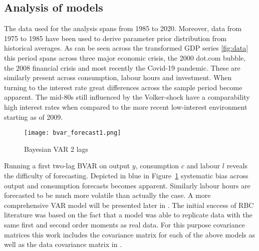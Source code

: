 \documentclass[12pt,a4paper,english]{article} %
\begin{document}
	\subsection{Analysis of models}
	The data used for the analysis spans from 1985 to 2020. Moreover, data from 1975 to 1985 have been used to derive parameter prior distribution from historical averages. 
	As can be seen across the transformed GDP series \ref{fig:data} this period spans across three major economic crisis, the 2000 dot.com bubble, the 2008 financial crisis and most recently the Covid-19 pandemic. These are similarly present across consumption, labour hours and investment. When turning to the interest rate great differences across the sample period become apparent. The mid-80s still influenced by the Volker-shock have a comparability high interest rates when compared to the more recent low-interest environment starting as of 2009.
	\begin{figure}[H]
		\begin{center}
			\texttt{[image: bvar\_forecast1.png]}
			\caption{Bayesian VAR 2 lags}
			\label{fig:bvar_2lags}
		\end{center}
	\end{figure}
	Running a first two-lag \ac{BVAR} on output $y$, consumption $c$ and labour $l$ reveals the difficulty of forecasting. Depicted in blue in Figure~\ref{fig:bvar_2lags} systematic bias across output and consumption forecasts becomes apparent. Similarly labour hours are forecasted to be much more volatile than actually the case. A more comprehensive \ac{VAR} model will be presented later in . The initial success of RBC literature was based on the fact that a model was able to replicate data with the same first and second order moments as real data. For this purpose covariance matrices this work includes the covariance matrix for each of the above models as well as the data covariance matrix in .
			
\end{document}
